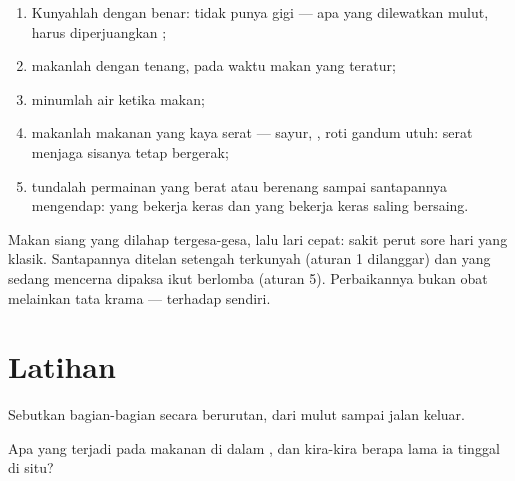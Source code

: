 \begin{method}\label{met:g4:journey-of-food:habits}
\begin{enumerate}
  \item Kunyahlah dengan benar:  tidak punya gigi --- apa yang
        dilewatkan mulut, harus diperjuangkan ;
  \item makanlah dengan tenang, pada waktu makan yang teratur;
  \item minumlah air ketika makan;
  \item makanlah makanan yang kaya serat --- sayur, , roti gandum
        utuh: serat menjaga sisanya tetap bergerak;
  \item tundalah permainan yang berat atau berenang sampai santapannya
        mengendap:  yang bekerja keras dan  yang bekerja
        keras saling bersaing.
\end{enumerate}
\end{method}

\begin{example}\label{ex:g4:journey-of-food:ache}
Makan siang yang dilahap tergesa-gesa, lalu lari cepat: sakit perut
sore hari yang klasik. Santapannya ditelan setengah terkunyah (aturan
1 dilanggar) dan  yang sedang mencerna dipaksa ikut berlomba
(aturan 5). Perbaikannya bukan obat melainkan tata krama --- terhadap
 sendiri.
\end{example}

\section{Latihan}

\begin{exercise}[$\star$]\label{exo:g4:journey-of-food:1}
Sebutkan bagian-bagian  secara berurutan, dari mulut
sampai jalan keluar.
\end{exercise}

\begin{exercise}[$\star$]\label{exo:g4:journey-of-food:2}
Apa yang terjadi pada makanan di dalam , dan kira-kira berapa
lama ia tinggal di situ?
\end{exercise}

